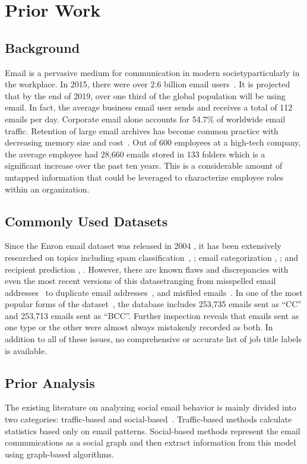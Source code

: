 \documentclass[12pt]{report}
\begin{document}
\chapter{Prior Work} \label{PriorWork}
\section{Background}
Email is a pervasive medium for communication in modern society\textemdash{}particularly in the workplace.
In 2015, there were over 2.6 billion email users~\cite{radicati_emails_2015}.
It is projected that by the end of 2019, over one third of the global population will be using email.
In fact, the average business email user sends and receives a total of 112 emails per day.
Corporate email alone accounts for 54.7\% of worldwide email traffic.
Retention of large email archives has become common practice with decreasing memory size and cost~\cite{fisher_revisiting_2006}.
Out of 600 employees at a high-tech company, the average employee had 28,660 emails stored in 133 folders which is a significant increase over the past ten years.
This is a considerable amount of untapped information that could be leveraged to characterize employee roles within an organization.
\section{Commonly Used Datasets}
Since the Enron email dataset was released in 2004 \cite{klimt_introducing_2004}, it has been extensively researched on topics including spam classification~\cite{gaber_e-mail_2016}, \cite{shams_classifying_2013}; email categorization \cite{he_novel_2014}, \cite{keila_structure_2005}; and recipient prediction \cite{sofershtein_predicting_2015}, \cite{hu_towards_2012}.
However, there are known flaws and discrepancies with even the most recent versions of this dataset\textemdash{}ranging from misspelled email addresses~\cite{nordbo_data_2014} to duplicate email addresses~\cite{waterman_big_2014}, and misfiled emails~\cite{namata_inferring_2006}.
In one of the most popular forms of the dataset~\cite{shetty_enron_2004}, the database includes 253,735 emails sent as ``CC'' and  253,713 emails sent as ``BCC''.
Further inspection reveals that emails sent as one type or the other were almost always mistakenly recorded as both.  In addition to all of these issues, no comprehensive or accurate list of job title labels is available.
\section{Prior Analysis}
The existing literature on analyzing social email behavior is mainly divided into two categories: traffic-based and social-based~\cite{tang_email_2013}.
Traffic-based methods calculate statistics based only on email patterns.
Social-based methods represent the email communications as a social graph and then extract information from this model using graph-based algorithms.
\end{document}
